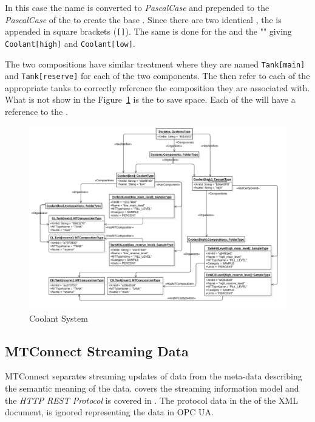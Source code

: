 In this case the  name is converted to \textit{PascalCase} and prepended to the \textit{PascalCase} of the  to create the base . Since there are two identical , the  is appended in square brackets (\texttt{[]}). The same is done for the   and the   "" giving \texttt{Coolant[high]} and \texttt{Coolant[low]}.

The two  compositions have similar treatment where they are named \texttt{Tank[main]} and \texttt{Tank[reserve]} for each of the two components. The  then refer to each of the appropriate tanks to correctly reference the composition they are associated with. What is not show in the Figure~\ref{fig:coolant-system} is the  to save space. Each of the  will have a  reference to the .

\begin{figure}[ht]
  \centering
  \includegraphics[width=1.0\textwidth]{diagrams/mtconnect-mapping/coolant-system.png}
  \caption{Coolant System}
  \label{fig:coolant-system}
\end{figure}

\FloatBarrier

\subsection{MTConnect Streaming Data}

MTConnect separates streaming updates of data from the meta-data describing the semantic meaning of the data. \cite{MTCPart3} covers the streaming information model and the \textit{HTTP REST Protocol}\cite{Fielding2000ArchitecturalArchitectures} is covered in \cite{MTCPart1}. The protocol data in the  of the XML document, is ignored representing the data in OPC UA. 

